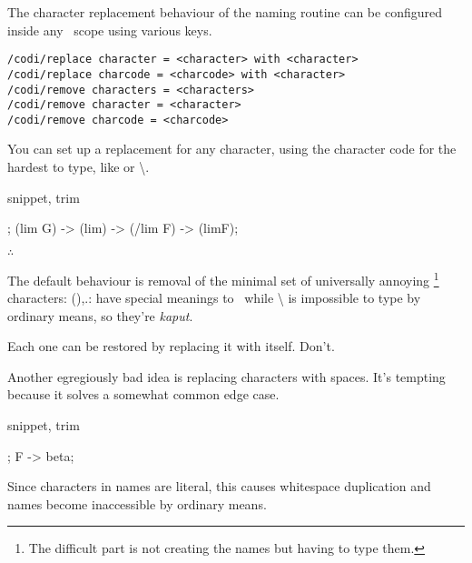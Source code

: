 The character replacement behaviour of the naming routine can be configured
inside any \CoDi\ scope using various keys.

\begin{lstlisting}[style=metacode]
/codi/replace character = <character> with <character>
/codi/replace charcode = <charcode> with <character>
/codi/remove characters = <characters>
/codi/remove character = <character>
/codi/remove charcode = <charcode>
\end{lstlisting}

You can set up a replacement for any character, using the character code for
the hardest to type, like {\ttfamily \textvisiblespace} or {\ttfamily \textbackslash}.

\begin{tcblisting}{snippet, trim}
\begin{codi}[tetragonal]
; %
\mor (lim G) -> (lim) -> (/lim F) -> (limF);
\end{codi}
\end{tcblisting}

\hfill$\therefore$\hfill\null

The default behaviour is removal of the minimal set of universally annoying%
\footnote{The difficult part is not creating the names but having to type them.}
characters: {\ttfamily (),.:}  have special meanings to \TikZ\ while
{\ttfamily \textbackslash} is impossible to type by ordinary means, so they're \emph{kaput}.

Each one can be restored by replacing it with itself. Don't.

Another egregiously bad idea is replacing characters with spaces.
It's tempting because it solves a somewhat common edge case.

\begin{tcblisting}{snippet, trim}
\begin{codi}[tetragonal]
;
\mor F -> beta;
\end{codi}
\end{tcblisting}

Since characters in names are literal, this causes whitespace
duplication and names become inaccessible by ordinary means.


